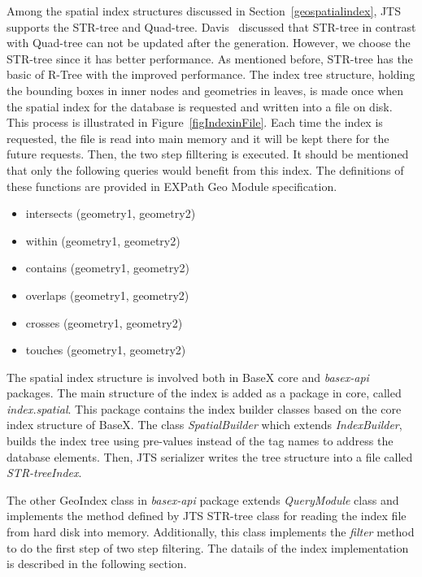 \documentclass[a4paper,12pt]{article}
\begin{document}
Among the spatial index structures discussed in Section~\ref{geospatialindex}, JTS supports the STR-tree and Quad-tree. Davis~\cite{jts-presentation} discussed that STR-tree in contrast with Quad-tree can not be updated after the generation. However, we choose the STR-tree since it has better performance. As mentioned before, STR-tree has the basic of R-Tree with the improved performance. The index tree structure, holding the bounding boxes in inner nodes and geometries in leaves, is made once when the spatial index for the database is requested and written into a file on disk. This process is illustrated in Figure~\ref{figIndexinFile}. Each time the index is requested, the file is read 
into main memory and it will be kept there for the future requests.
Then, the two step filltering is executed. 
It should be mentioned that only the following queries would benefit from this index. The definitions of these functions are provided in EXPath Geo Module specification.
\begin{itemize}
\item intersects (geometry1, geometry2)
\item within (geometry1, geometry2)
\item contains (geometry1, geometry2)
\item overlaps (geometry1, geometry2)
\item crosses (geometry1, geometry2)
\item touches (geometry1, geometry2)
\end{itemize}

The spatial index structure is involved both in BaseX core and \textit{basex-api} packages. The main structure of the index is added as a package in core, called \textit{index.spatial}. This package contains the index builder classes based on the core index structure of BaseX. The class \textit{SpatialBuilder} which extends \textit{IndexBuilder}, builds the index tree using pre-values instead of the tag names to address the database elements. Then, JTS serializer writes the tree structure into a file called \textit{STR-treeIndex}.

The other GeoIndex class in \textit{basex-api} package extends \textit{QueryModule} class and implements the method defined by JTS STR-tree class for reading the index file from hard disk into memory. Additionally, this class implements the \textit{filter} method to do the first step of two step filtering. The datails of the index implementation is described in the following section.
 
\end{document}

